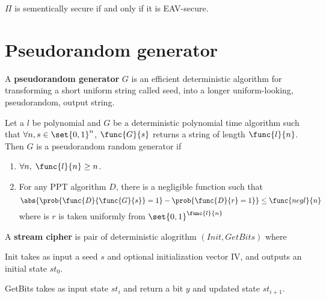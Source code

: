 \begin{theorem}
    \(\Pi\) is sementically secure if and only if it is EAV-secure.
\end{theorem}

\section{Pseudorandom generator}
A \textbf{pseudorandom generator} \(G\) is an efficient deterministic algorithm for transforming a short uniform string called seed, into a longer uniform-looking, pseudorandom, output string.
\begin{definition}
    Let a \(l\) be polynomial and \(G\) be a deterministic polynomial time algorithm such that \(\forall n, s \in \set{0,1}^n\), \(\func{G}{s}\) returns a string of length \(\func{l}{n}\). Then \(G\) is a pseudorandom random generator if 
    \begin{enumerate}
        \item \(\forall n, \; \func{l}{n} \geq n \). 
        \item For any PPT algorithm \(D\), there is a negligible function such that 
        \begin{equation*}
            \abs{\prob{\func{D}{\func{G}{s}} = 1} - \prob{\func{D}{r} = 1}} \leq \func{negl}{n}
        \end{equation*}
        where is \(r\) is taken uniformly from \(\set{0,1}^{\func{l}{n}}\)
    \end{enumerate}
\end{definition}

A \textbf{stream cipher} is pair of deterministic alogrithm \((Init, GetBits)\) where 
\begin{definition}
    \item[Init] takes as input a seed \(s\) and optional initialization vector IV, and outputs an initial state \(st_0\).
    \item[GetBits] takes as input state \(st_i\) and return a bit \(y\) and updated state \(st_{i + 1}\). 
\end{definition}

